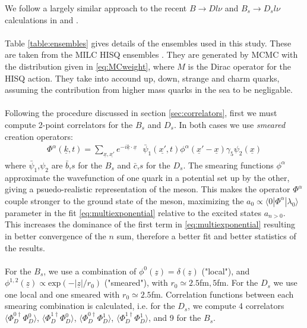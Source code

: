\documentclass[a4paper,10pt]{article}
\numberwithin{equation}{section}
\begin{document}
We follow a largely similar approach to the recent $B\to Dl\nu$ and $B_s\to D_sl\nu$ calculations in \cite{Na:2015kha} and \cite{Monahan:2017uby}.
\\ \\
Table \ref{table:ensembles} gives details of the ensembles used in this study. These are taken from the MILC HISQ ensembles \cite{Bazavov:2012xda}. They are generated by MCMC with the distribution given in \eqref{eq:MCweight}, where $M$ is the Dirac operator for the HISQ action. They take into accound up, down, strange and charm quarks, assuming the contribution from higher mass quarks in the sea to be negligable.
\\ \\
Following the procedure discussed in section \ref{sec:correlators}, first we must compute 2-point correlators for the $B_s$ and $D_s$. In both cases we use \textit{smeared} creation operators:
\begin{align}
	\Phi^{\alpha}(\underline{k},t) = \sum_{\underline{x},\underline{x'}} e^{-i\underline{k}\cdot\underline{x}} \text{ } \bar{\psi}_1(\underline{x'},t)\phi^{\alpha}(\underline{x}'-\underline{x}) \gamma_5 \psi_2(\underline{x})
\end{align}
where $\bar{\psi}_1$,$\psi_2$ are $\bar{b}$,$s$ for the $B_s$ and $\bar{c}$,$s$ for the $D_s$. The smearing functions $\phi^{\alpha}$ approximate the wavefunction of one quark in a potential set up by the other, giving a psuedo-realistic representation of the meson. This makes the operator $\Phi^{\alpha}$ couple stronger to the ground state of the meson, maximizing the $a_0 \propto \langle0 |\Phi^{\alpha}|\lambda_0\rangle$ parameter in the fit \eqref{eq:multiexponential} relative to the excited states $a_{n>0}$. This increases the dominance of the first term in \eqref{eq:multiexponential} resulting in better convergence of the $n$ sum, therefore a better fit and better statistics of the results.
\\ \\
For the $B_s$, we use a combination of $\phi^0(\underline{z})=\delta(\underline{z})$ ("local"), and $\phi^{1,2}(\underline{z}) \propto \text{exp}(-|\underline{z}|/r_0)$ ("smeared"), with $r_0 \simeq 2.5$fm$, 5$fm. For the $D_s$ we use one local and one smeared with $r_0\simeq2.5$fm. Correlation functions between each smearing combination is calculated, i.e. for the $D_s$, we compute 4 correlators $\langle \Phi^{0\dagger}_D\Phi_D^0 \rangle$, $\langle \Phi^{1\dagger}_D\Phi_D^0 \rangle$, $\langle \Phi^{0\dagger}_D\Phi_D^1 \rangle$, $\langle \Phi^{1\dagger}_D\Phi_D^1 \rangle$, and 9 for the $B_s$.
\end{document}
